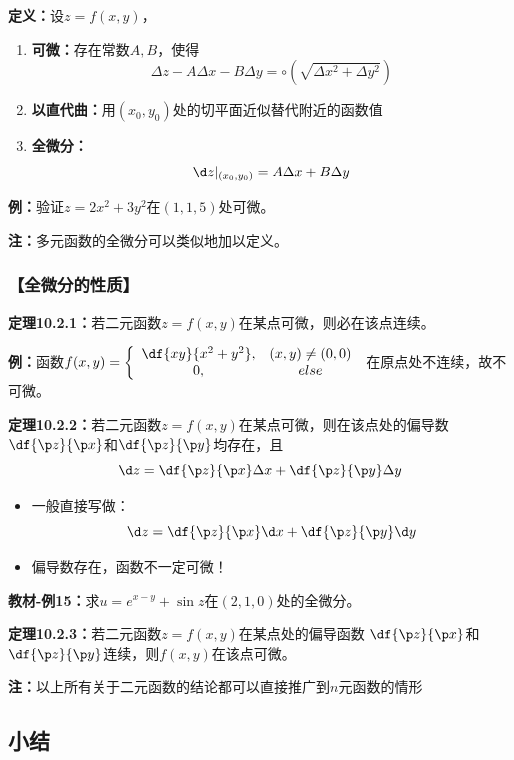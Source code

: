 {\bf 定义：}设$z=f(x,y)$，
\begin{enumerate}[(1)]
  \setlength{\itemindent}{1cm}
  \item {\bf 可微：}存在常数$A,B$，使得
  $${\Delta z-A\Delta x-B\Delta y=\circ(\sqrt{\Delta x^2+\Delta y^2})}$$
  \item {\bf 以直代曲：}用$(x_0,y_0)$处的切平面近似替代附近的函数值
  \item {\bf 全微分：}$${\d z|_{(x_0,y_0)}=A\Delta x+B\Delta y}$$
\end{enumerate}

{\bf 例：}验证$z=2x^2+3y^2$在$(1,1,5)$处可微。

{\bf 注：}多元函数的全微分可以类似地加以定义。

\subsubsection{【全微分的性质】}

{\bf 定理10.2.1：}若二元函数$z=f(x,y)$在某点可微，则必在该点连续。

{\bf 例：}函数$f(x,y)=\left\{\begin{array}{cc}
	\df{xy}{x^2+y^2},& (x,y)\ne (0,0)\\
	0, & else
\end{array}\right.$
在原点处不连续，故不可微。

{\bf 定理10.2.2：}若二元函数$z=f(x,y)$在某点可微，则在该点处的偏导数
$\df{\p z}{\p x}$和$\df{\p z}{\p y}$均存在，且
$$\d z=\df{\p z}{\p x}\Delta x+\df{\p z}{\p y}\Delta y$$

\begin{itemize}
  \item 一般直接写做：
  $${\d z=\df{\p z}{\p x}\d x+\df{\p z}{\p y}\d y}$$ 
  \item 偏导数存在，函数不一定可微！
\end{itemize}

{\bf 教材-例15：}求$u=e^{x-y}+\sin z$在$(2,1,0)$处的全微分。

{\bf 定理10.2.3：}若二元函数$z=f(x,y)$在某点处的偏导函数
$\df{\p z}{\p x}$和$\df{\p z}{\p y}$连续，则$f(x,y)$在该点可微。

{\bf 注：}以上所有关于二元函数的结论都可以直接推广到$n$元函数的情形

\subsection*{小结}

